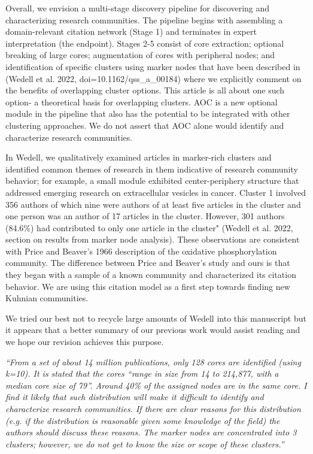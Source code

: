 \documentclass[11pt, oneside]{article}   	%
\begin{document}
Overall, we envision a multi-stage discovery pipeline for discovering and characterizing research communities. The pipeline begins with assembling a domain-relevant citation network (Stage 1) and terminates in expert interpretation (the endpoint). Stages 2-5 consist of core extraction; optional breaking of large cores; augmentation of cores with peripheral nodes; and identification of specific clusters using marker nodes that have been described in (Wedell et al. 2022, doi=10.1162/qss\_a\_00184) where we explicitly comment on the benefits of overlapping cluster options. This article is all about one such option- a theoretical basis for overlapping clusters. AOC is a new optional module in the pipeline  that also has the potential to be integrated with other clustering approaches. We do not assert that AOC alone would identify and characterize research communities.


In Wedell, we qualitatively examined articles in marker-rich clusters and identified common themes of research in them indicative of research community behavior; for example, a small module exhibited center-periphery structure that addressed emerging research on extracellular vesicles in cancer. Cluster 1 involved 356 authors of which nine were authors of at least five articles in the cluster and one person was an author of 17 articles in the cluster. However, 301 authors (84.6\%) had contributed to only one article in the cluster" (Wedell et al. 2022, section on results from marker node analysis). These observations are consistent with Price and Beaver's 1966 description of the oxidative phosphorylation community. The difference between Price and Beaver's study and ours is that they began with a sample of a known community and characterized its citation behavior. We are using this citation model as a first step towards finding new Kuhnian communities. 

We tried our best not to recycle large amounts of Wedell into this manuscript but it appears that a better summary of our previous work would assist reading and we hope our revision achieves this purpose. 

\emph{``From a set of about 14 million publications, only 128 cores are identified (using k=10). It is stated that the cores “range in size from 14 to 214,877, with a median core size of 79”. Around 40\% of the assigned nodes are in the same core. I find it likely that such distribution will make it difficult to identify and characterize research communities. If there are clear reasons for this distribution (e.g. if the distribution is reasonable given some knowledge of the field) the authors should discuss these reasons. The marker nodes are concentrated into 3 clusters; however, we do not get to know the size or scope of these clusters.''}
\end{document}
